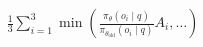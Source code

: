 \documentclass[preview]{standalone}
\begin{document}
\begin{align*}
\frac{1}{3} \sum_{i=1}^3 \min \left( \frac{\pi_\theta(o_i \mid q)}{\pi_{\theta_{\text{old}}}(o_i \mid q)} A_i, \dots \right)
\end{align*}
\end{document}
